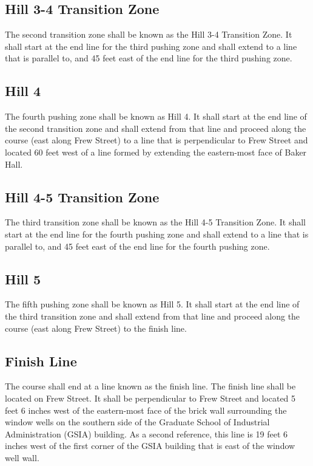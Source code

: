 \subsection{Hill 3-4 Transition Zone}

	The second transition zone shall be known as the Hill 3-4 Transition Zone. It
	shall start at the end line for the third pushing zone and shall extend to a
	line that is parallel to, and 45 feet east of the end line for the third
	pushing zone.

\subsection{Hill 4}

	The fourth pushing zone shall be known as Hill 4. It shall start at the end
	line of the second transition zone and shall extend from that line and proceed
	along the course (east along Frew Street) to a line that is perpendicular to
	Frew Street and located 60 feet west of a line formed by extending the
	eastern-most face of Baker Hall.

\subsection{Hill 4-5 Transition Zone}

	The third transition zone shall be known as the Hill 4-5 Transition Zone. It
	shall start at the end line for the fourth pushing zone and shall extend to a
	line that is parallel to, and 45 feet east of the end line for the fourth
	pushing zone.

\subsection{Hill 5}

	The fifth pushing zone shall be known as Hill 5. It shall start at the end line
	of the third transition zone and shall extend from that line and proceed along
	the course (east along Frew Street) to the finish line.

\subsection{Finish Line}

	The course shall end at a line known as the finish line. The finish line shall
	be located on Frew Street. It shall be perpendicular to Frew Street and located
	5 feet 6 inches west of the eastern-most face of the brick wall surrounding the
	window wells on the southern side of the Graduate School of Industrial
	Administration (GSIA) building. As a second reference, this line is 19 feet 6
	inches west of the first corner of the GSIA building that is east of the window
	well wall.


